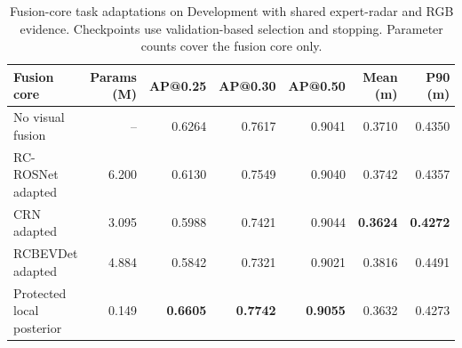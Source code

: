 \begin{table}[t]
\centering\small
\caption{Fusion-core task adaptations on Development with shared expert-radar and RGB evidence. Checkpoints use validation-based selection and stopping. Parameter counts cover the fusion core only.}
\label{tab:public-fusion-baselines}
\begin{tabular*}{\textwidth}{@{\extracolsep{\fill}}lrrrrrr@{}}
\toprule
Fusion core & Params (M)&AP@0.25&AP@0.30&AP@0.50&Mean (m)&P90 (m)\\
\midrule
No visual fusion &--&0.6264&0.7617&0.9041&0.3710&0.4350\\
RC-ROSNet adapted &6.200&0.6130&0.7549&0.9040&0.3742&0.4357\\
CRN adapted &3.095&0.5988&0.7421&0.9044&\textbf{0.3624}&\textbf{0.4272}\\
RCBEVDet adapted &4.884&0.5842&0.7321&0.9021&0.3816&0.4491\\
Protected local posterior &0.149&\textbf{0.6605}&\textbf{0.7742}&\textbf{0.9055}&0.3632&0.4273\\
\bottomrule
\end{tabular*}
\end{table}
